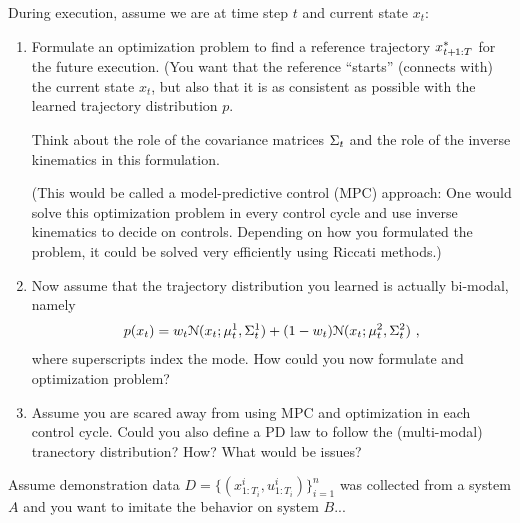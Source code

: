 During execution, assume we are at time step $t$ and current state $x_t$:
\begin{enumerate}
\item Formulate an optimization problem to find a reference trajectory $x^*_{t\po:T}$ for the future execution. (You want that the reference ``starts'' (connects with) the current state $x_t$, but also that it is as consistent as possible with the learned trajectory distribution $p$.

Think about the role of the covariance matrices $\S_t$ and the role of the inverse kinematics in this formulation.

{\tiny (This would be called a model-predictive control (MPC) approach: One would solve this optimization problem in every control cycle and use inverse kinematics to decide on controls. Depending on how you formulated the problem, it could be solved very efficiently using Riccati methods.)

}


\item Now assume that the trajectory distribution you learned is actually bi-modal, namely
\begin{align}
p(x_t) = w_t \NN(x_t; \mu^1_t, \S^1_t) + (1-w_t) \NN(x_t; \mu^2_t, \S^2_t) ~, \end{align}
where superscripts index the mode. How could you now formulate and optimization problem?

\item Assume you are scared away from using MPC and optimization in each control cycle. Could you also define a PD law to follow the (multi-modal) tranectory distribution? How? What would be issues?
\end{enumerate}



Assume demonstration data $D=\{(x^i_{1:T_i}, u^i_{1:T_i})\}_{i=1}^n$ was collected from a system $A$ and you want to imitate the behavior on system $B$...


\exerfoot
